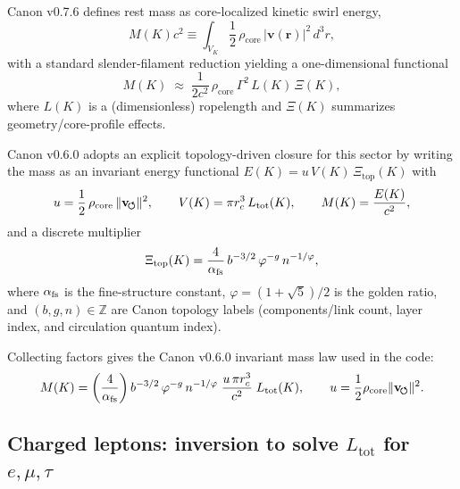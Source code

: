 \documentclass[10pt]{article}
\newcommand{\vswirl}{\mathbf{v}_{\!\boldsymbol{\circlearrowleft}}}
\begin{document}
        Canon v0.7.6 defines rest mass as core-localized kinetic swirl energy,
        \begin{equation}
            M(K)c^2 \equiv \int_{V_K}\frac12\,\rho_{\text{core}}\,|\mathbf v(\mathbf r)|^2\,d^3r,
            \label{eq:mass_core_integral}
        \end{equation}
        with a standard slender-filament reduction yielding a one-dimensional functional
        \begin{equation}
            M(K)\;\approx\;\frac{1}{2c^2}\,\rho_{\text{core}}\,\Gamma^2\,L(K)\,\Xi(K),
            \label{eq:mass_slender_reduction}
        \end{equation}
        where $L(K)$ is a (dimensionless) ropelength and $\Xi(K)$ summarizes geometry/core-profile effects.

        Canon v0.6.0 adopts an explicit topology-driven closure for this sector by writing the mass as an invariant
        energy functional $E(K)=u\,V(K)\,\Xi_{\text{top}}(K)$ with
        \begin{equation}
            u=\frac12\,\rho_{\text{core}}\,\|\vswirl\|^2,
            \qquad
            V(K)=\pi \rc^3\,L_{\text{tot}}(K),
            \qquad
            M(K)=\frac{E(K)}{c^2},
            \label{eq:mass_kernel_uv}
        \end{equation}
        and a discrete multiplier
        \begin{equation}
            \Xi_{\text{top}}(K)=\frac{4}{\alpha_{\rm fs}}\,b^{-3/2}\,\varphi^{-g}\,n^{-1/\varphi},
            \label{eq:Xi_top}
        \end{equation}
        where $\alpha_{\rm fs}$ is the fine-structure constant, $\varphi=(1+\sqrt5)/2$ is the golden ratio,
        and $(b,g,n)\in\mathbb Z$ are Canon topology labels (components/link count, layer index, and circulation quantum index).

        Collecting factors gives the Canon v0.6.0 invariant mass law used in the code:
        \begin{equation}
            M(K)=
            \left(\frac{4}{\alpha_{\rm fs}}\right)
            b^{-3/2}\,\varphi^{-g}\,n^{-1/\varphi}\;
            \frac{u\,\pi \rc^3}{c^2}\;L_{\text{tot}}(K),
            \qquad
            u=\frac12\rho_{\text{core}}\|\vswirl\|^2.
            \label{eq:master_mass_law}
        \end{equation}

    \subsection{Charged leptons: inversion to solve $L_{\text{tot}}$ for $e,\mu,\tau$}
\end{document}
